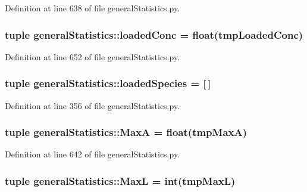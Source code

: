 \-Definition at line 638 of file general\-Statistics.\-py.

\hypertarget{namespacegeneral_statistics_a6b5cf2698396af31b36f7dbd4743164a}{
\subsubsection[{loaded\-Conc}]{\setlength{\rightskip}{0pt plus 5cm}tuple {\bf general\-Statistics\-::loaded\-Conc} = float(tmp\-Loaded\-Conc)}}\label{namespacegeneral_statistics_a6b5cf2698396af31b36f7dbd4743164a}


\-Definition at line 652 of file general\-Statistics.\-py.

\hypertarget{namespacegeneral_statistics_af29ad6a22b3f3465af2fe01a8e83b7e5}{
\subsubsection[{loaded\-Species}]{\setlength{\rightskip}{0pt plus 5cm}tuple {\bf general\-Statistics\-::loaded\-Species} = \mbox{[}$\,$\mbox{]}}}\label{namespacegeneral_statistics_af29ad6a22b3f3465af2fe01a8e83b7e5}


\-Definition at line 356 of file general\-Statistics.\-py.

\hypertarget{namespacegeneral_statistics_a8c7eaceb16faabc2452eb6ec26a244ce}{
\subsubsection[{\-Max\-A}]{\setlength{\rightskip}{0pt plus 5cm}tuple {\bf general\-Statistics\-::\-Max\-A} = float(tmp\-Max\-A)}}\label{namespacegeneral_statistics_a8c7eaceb16faabc2452eb6ec26a244ce}


\-Definition at line 642 of file general\-Statistics.\-py.

\hypertarget{namespacegeneral_statistics_a06985566d39675323e33de90bd0a73d7}{
\subsubsection[{\-Max\-L}]{\setlength{\rightskip}{0pt plus 5cm}tuple {\bf general\-Statistics\-::\-Max\-L} = int(tmp\-Max\-L)}}\label{namespacegeneral_statistics_a06985566d39675323e33de90bd0a73d7}


